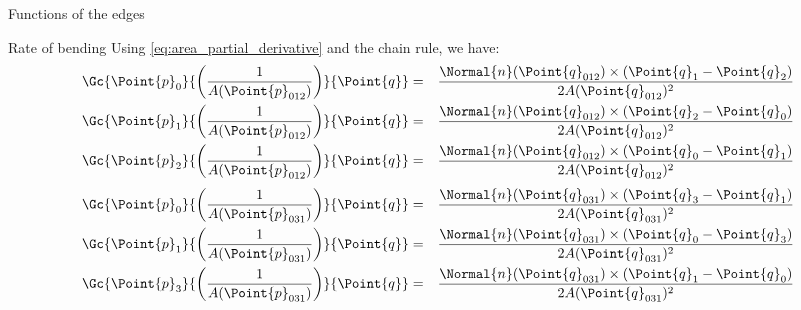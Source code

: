 \begin{plSection}{Functions of the edges}
\begin{plSection}{Rate of bending}
Using \cref{eq:area_partial_derivative}
and the chain rule, we have:
\begin{eqnarray}
\label{eq:inverse-area-gradient-012}
\Gc{\Point{p}_0}{\left( \frac{1}{A(\Point{p}_{012})} \right)}{\Point{q}}
& = &
{{\Normal{n}(\Point{q}_{012}) \times \left( \Point{q}_1 - \Point{q}_2 \right)}
\over
{2 A(\Point{q}_{012})^2 } }
\\
\Gc{\Point{p}_1}{\left( \frac{1}{A(\Point{p}_{012})} \right)}{\Point{q}}
& = &
{{\Normal{n}(\Point{q}_{012}) \times \left( \Point{q}_2 - \Point{q}_0 \right)}
\over
{2 A(\Point{q}_{012})^2 } }
\nonumber
\\
\Gc{\Point{p}_2}{\left( \frac{1}{A(\Point{p}_{012})} \right)}{\Point{q}}
& = &
{{\Normal{n}(\Point{q}_{012}) \times \left( \Point{q}_0 - \Point{q}_1 \right)}
\over
{2 A(\Point{q}_{012})^2 } }
\nonumber
\end{eqnarray}
\begin{eqnarray}
\label{eq:inverse-area-gradient-031}
\Gc{\Point{p}_0}{\left( \frac{1}{A(\Point{p}_{031})} \right)}{\Point{q}}
& = &
{{\Normal{n}(\Point{q}_{031}) \times \left( \Point{q}_3 - \Point{q}_1 \right)}
\over
{2 A(\Point{q}_{031})^2 } }
\\
\Gc{\Point{p}_1}{\left( \frac{1}{A(\Point{p}_{031})} \right)}{\Point{q}}
& = &
{{\Normal{n}(\Point{q}_{031}) \times \left( \Point{q}_0 - \Point{q}_3 \right)}
\over
{2 A(\Point{q}_{031})^2 } }
\nonumber
\\
\Gc{\Point{p}_3}{\left( \frac{1}{A(\Point{p}_{031})} \right)}{\Point{q}}
& = &
{{\Normal{n}(\Point{q}_{031}) \times \left( \Point{q}_1 - \Point{q}_0 \right)}
\over
{2 A(\Point{q}_{031})^2 } }
\nonumber
\end{eqnarray}

\end{plSection}%
\end{plSection}%
